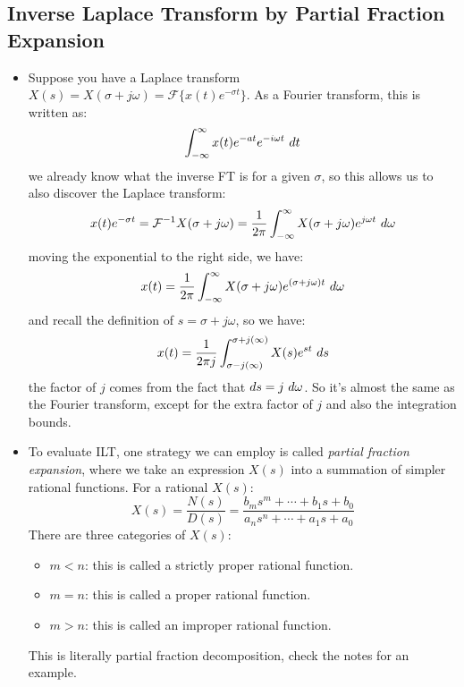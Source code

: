 \subsection{Inverse Laplace Transform by Partial Fraction Expansion}
\begin{itemize}
	\item Suppose you have a Laplace transform \( X(s) = X(\sigma + j \omega) = \mathcal F \{x(t) e^{-\sigma t}\} \). 
		As a Fourier transform, this is written as:
		\[
		\int_{-\infty}^{\infty} x(t) e^{-at}e^{- i \omega t }\ d t 
		\] 
		we already know what the inverse FT is for a given \( \sigma \), so this allows us to 
		also discover the Laplace transform:
		\[
			x(t)e^{-\sigma t} = \mathcal F^{-1} {X(\sigma + j \omega)}  = \frac{1}{2\pi}
			\int_{-\infty}^{\infty} X(\sigma + j \omega) e^{j \omega t}\ d \omega 
		\] 
		moving the exponential to the right side, we have:
		\[
		x(t) = \frac{1}{2\pi}\int_{-\infty}^{\infty} X(\sigma + j \omega) e^{(\sigma + j \omega) t} \ d  \omega 
		\] 
		and recall the definition of \( s = \sigma + j \omega \), so we have:
		\[
			x(t) = \frac{1}{2\pi j} \int_{\sigma - j (\infty)}^{\sigma + j (\infty)} X(s) e^{st} \ d s 
		\] 
		the factor of \( j \) comes from the fact that \( ds = j \ d \omega\). So it's almost the same 
		as the Fourier transform, except for the extra factor of \( j \) and also the integration bounds. 
		

	\item To evaluate ILT, one strategy we can employ is called \textit{partial fraction expansion}, where we 
		take an expression \( X(s) \) into a summation of simpler rational functions. For a rational 
		\( X(s) \):
		\[
		X(s) = \frac{N(s)}{D(s)} = \frac{b_m s^{m} + \cdots + b_1s + b_0}{a_n s^{n} + \cdots + a_1s + a_0}
		\] 
		There are three categories of \( X(s) \):
		\begin{itemize}
			\item \( m < n \): this is called a strictly proper rational function.
			\item \( m = n \): this is called a proper rational function.
			\item \( m > n \): this is called an improper rational function. 
		\end{itemize}
		This is literally partial fraction decomposition, check the notes for an example.  
\end{itemize}
